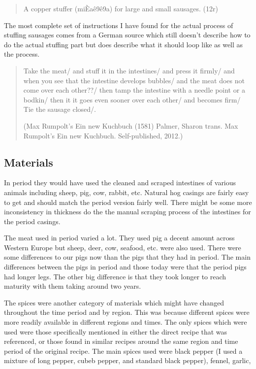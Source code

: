 \documentclass[letterpaper,11pt,leqno]{article}
\begin{document}
\begin{quote}
	A copper stuffer (miÈaê9ê9a) for large and small sausages. (12r) \linebreak
	 \citep[p. 87]{al2007annals}
	\label{MetalStuffer}
\end{quote}

The most complete set of instructions I have found for the actual process of stuffing sausages comes from a German source which still doesn't describe how to do the actual stuffing part but does describe what it should loop like as well as the process.

\begin{quote}
	Take the meat/ and stuff it in the intestines/ and press it firmly/ and when you see that the intestine develops bubbles/ and the meat does not come over each other??/ then tamp the intestine with a needle point or a bodkin/ then it it goes even sooner over each other/ and becomes firm/ Tie the sausage closed/.

	(Max Rumpolt’s Ein new Kuchbuch (1581)
	Palmer, Sharon trans.  Max Rumpolt’s Ein new Kuchbuch.  Self-published, 2012.)
\end{quote}



\subsection{Materials}

In period they would have used the cleaned and scraped intestines of various animals including sheep, pig, cow, rabbit, etc. Natural hog casings are fairly easy to get and should match the period version fairly well. There might be some more inconsistency in thickness do the the manual scraping process of the intestines for the period casings.

The meat used in period varied a lot. They used pig a decent amount across Western Europe but sheep, deer, cow, seafood, etc. were also used. There were some differences to our pigs now than the pigs that they had in period. The main differences between the pigs in period and those today were that the period pigs had longer legs. The other big difference is that they took longer to reach maturity with them taking around two years.

The spices were another category of materials which might have changed throughout the time period and by region. This was because different spices were more readily available in different regions and times. The only spices which were used were those specifically mentioned in either the direct recipe that was referenced, or those found in similar recipes around the same region and time period of the original recipe. The main spices used were black pepper (I used a mixture of long pepper, cubeb pepper, and standard black pepper), fennel, garlic,
\end{document}
